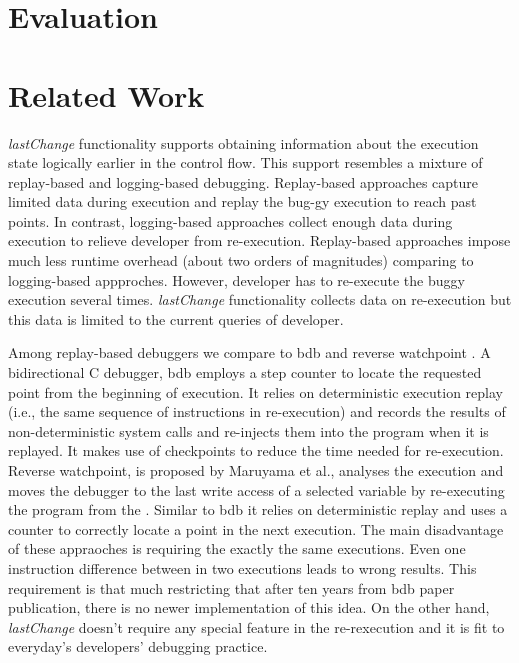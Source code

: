 \documentclass[preprint]{sigplanconf}
\begin{document}
\section{Evaluation}

\section{Related Work}

\textit{lastChange} functionality supports obtaining information about the execution state logically earlier in the control flow. This support resembles a mixture of replay-based and logging-based debugging. Replay-based approaches capture limited data during execution and replay the bug-gy execution to reach past points. In contrast, logging-based approaches collect enough data during execution to relieve developer from re-execution. Replay-based approaches impose much less runtime overhead (about two orders of magnitudes) comparing to logging-based appproches. However, developer has to re-execute the buggy execution several times. \textit{lastChange} functionality collects data on re-execution but this data is limited to the current queries of developer.

Among replay-based debuggers we compare to bdb \cite{Boothe} and reverse watchpoint \cite{Maruyama}.  A bidirectional C debugger, bdb employs a step counter to locate the requested point from the beginning of execution. It relies on deterministic execution replay (i.e., the same sequence of instructions in re-execution) and records the results of non-deterministic system calls and re-injects them into the program when it is replayed. It makes use of checkpoints to reduce the time needed for re-execution.  Reverse watchpoint, is proposed by Maruyama et al., analyses the execution and moves the debugger to the last write access of a selected variable by re-executing the program from the \cite{Maruyama}.  Similar to bdb it relies on deterministic replay and uses a counter to correctly locate a point in the next execution. The main disadvantage of these appraoches is requiring the exactly the same executions. Even one instruction difference between in two executions leads to wrong results. This requirement is that much restricting that after ten years from bdb paper publication, there is no newer implementation of this idea. On the other hand, \textit{lastChange} doesn't require any special feature in the re-rexecution and it is fit to everyday's developers' debugging practice. 
\end{document}
